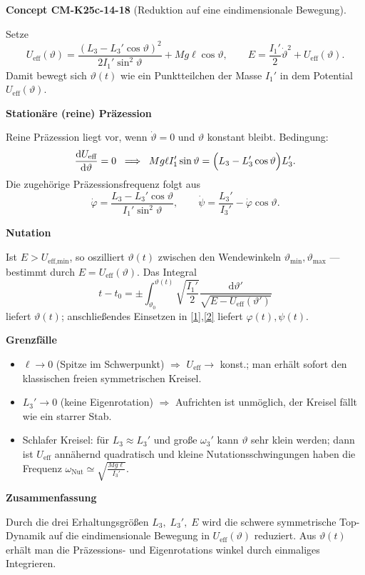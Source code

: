 \documentclass[10pt, letterpaper]{article}
\newcommand{\CustomHeading}[3]{%
  \par\medskip\noindent%
  \textbf{#1 #2} \textnormal{(#3)}.\enskip%
}
\newenvironment{CONC}[2]{\CustomHeading{Concept}{#1}{#2}}{}
\begin{document}
\begin{CONC}{CM-K25c-14-18}{Reduktion auf eine eindimensionale Bewegung}
Setze
\[
U_{\text{eff}}(\vartheta)=
  \frac{(L_3-L_3'\cos\vartheta)^{2}}{2I_1'\sin^{2}\vartheta}
  +Mg\ell\cos\vartheta ,
\qquad
E=\frac{I_1'}{2}\dot{\vartheta}^{2}+U_{\text{eff}}(\vartheta).
\tag{3$'$}
\]
Damit bewegt sich \(\vartheta(t)\) wie ein Punktteilchen der Masse
\(I_1'\) in dem Potential \(U_{\text{eff}}(\vartheta)\).

\textbf{Stationäre (reine) Präzession}

Reine Präzession liegt vor, wenn \(\dot{\vartheta}=0\) und
\(\vartheta\) konstant bleibt.  
Bedingung:
\[
\frac{\mathrm dU_{\text{eff}}}{\mathrm d\vartheta}=0
\;\;\Longrightarrow\;\;
Mg\ell I_1'\sin\vartheta
=\Bigl(L_3-L_3'\cos\vartheta\Bigr)L_3'.
\]
Die zugehörige Präzessionsfrequenz folgt aus
\[
\dot{\varphi}
 =\frac{L_3-L_3'\cos\vartheta}{I_1'\sin^{2}\vartheta},
\qquad
\dot{\psi}
 =\frac{L_3'}{I_3'}-\dot{\varphi}\cos\vartheta .
\]

\textbf{Nutation}

Ist \(E>U_{\text{eff,min}}\), so oszilliert \(\vartheta(t)\) zwischen
den Wendewinkeln \(\vartheta_{\min },\vartheta_{\max }\) —
bestimmt durch \(E=U_{\text{eff}}(\vartheta)\).  
Das Integral
\[
t-t_0
 =\pm\int_{\vartheta_0}^{\vartheta(t)}
     \sqrt{\frac{I_1'}{2}}
     \frac{\mathrm d\vartheta'}
          {\sqrt{E-U_{\text{eff}}(\vartheta')}} 
\]
liefert \(\vartheta(t)\); anschließendes Einsetzen in
\eqref{1},\eqref{2} liefert \(\varphi(t),\psi(t)\).

\textbf{Grenzfälle}

\begin{itemize}
\item \(\ell\to 0\) (Spitze im Schwerpunkt) $\Rightarrow$
      \(U_{\text{eff}}\to\) konst.; man erhält sofort den
      klassischen freien symmetrischen Kreisel.
\item \(L_3'\to 0\) (keine Eigenrotation) $\Rightarrow$
      Aufrichten ist unmöglich, der Kreisel fällt wie ein starrer Stab.
\item Schlafer Kreisel:
      für \(L_3\!\approx\!L_3'\) und große \(\omega_3'\) kann
      \(\vartheta\) sehr klein werden; dann ist
      \(U_{\text{eff}}\) annähernd quadratisch und 
      kleine Nutations­schwingungen haben die Frequenz
      \(\displaystyle
        \omega_{\text{Nut}}
        \simeq\sqrt{\frac{Mg\ell}{I_3'}}\).
\end{itemize}

\textbf{Zusammenfassung}

Durch die drei Erhaltungsgrößen
\(
  L_3,\;L_3',\;E
\)
wird die schwere symmetrische Top-Dynamik auf die eindimensionale
Bewegung in \(U_{\text{eff}}(\vartheta)\) reduziert.
Aus \(\vartheta(t)\) erhält man die Präzessions- und Eigenrotations­
winkel durch einmaliges Integrieren.
\end{CONC}
\end{document}
